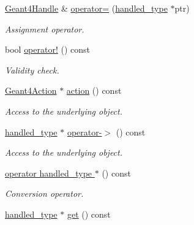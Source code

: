 \begin{DoxyCompactItemize}
\hyperlink{class_d_d4hep_1_1_simulation_1_1_geant4_handle}{Geant4Handle} \& \hyperlink{class_d_d4hep_1_1_simulation_1_1_geant4_handle_ab249ffa125a4a3460135843a2fd83a75}{operator=} (\hyperlink{class_d_d4hep_1_1_simulation_1_1_geant4_handle_a35e583b9228e38c95d23112ad19b645d}{handled\_\-type} $\ast$ptr)
\begin{DoxyCompactList}\small\item\em Assignment operator. \item\end{DoxyCompactList}\item 
bool \hyperlink{class_d_d4hep_1_1_simulation_1_1_geant4_handle_ab8fc941ffeb55715ef6aa2b84b363dbb}{operator!} () const 
\begin{DoxyCompactList}\small\item\em Validity check. \item\end{DoxyCompactList}\item 
\hyperlink{class_d_d4hep_1_1_simulation_1_1_geant4_action}{Geant4Action} $\ast$ \hyperlink{class_d_d4hep_1_1_simulation_1_1_geant4_handle_a60a914f166e6a02fda749e519af8d4ab}{action} () const 
\begin{DoxyCompactList}\small\item\em Access to the underlying object. \item\end{DoxyCompactList}\item 
\hyperlink{class_d_d4hep_1_1_simulation_1_1_geant4_handle_a35e583b9228e38c95d23112ad19b645d}{handled\_\-type} $\ast$ \hyperlink{class_d_d4hep_1_1_simulation_1_1_geant4_handle_a9404f8a821a678333390b2643809e975}{operator-\/$>$} () const 
\begin{DoxyCompactList}\small\item\em Access to the underlying object. \item\end{DoxyCompactList}\item 
\hyperlink{class_d_d4hep_1_1_simulation_1_1_geant4_handle_a1544c6b402adaf90da56991dfdaf87b6}{operator handled\_\-type $\ast$} () const 
\begin{DoxyCompactList}\small\item\em Conversion operator. \item\end{DoxyCompactList}\item 
\hyperlink{class_d_d4hep_1_1_simulation_1_1_geant4_handle_a35e583b9228e38c95d23112ad19b645d}{handled\_\-type} $\ast$ \hyperlink{class_d_d4hep_1_1_simulation_1_1_geant4_handle_a4d91fe5a7397f397bbf2e066571a3b76}{get} () const 

\end{DoxyCompactItemize}
